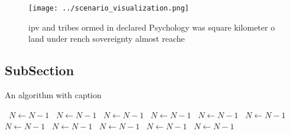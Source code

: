 \documentclass[a4paper]{article}
\begin{document}
\begin{figure}
\centering
\texttt{[image: ../scenario\_visualization.png]}
\caption{ipv and tribes ormed in declared Psychology was square kilometer o land under rench sovereignty almost reache
}
\end{figure}
 
\subsection{SubSection}

\begin{algorithm}
\caption{An algorithm with caption}
\begin{algorithmic}
\    \State $N \gets N - 1$
\    \State $N \gets N - 1$
\    \State $N \gets N - 1$
\    \State $N \gets N - 1$
\    \State $N \gets N - 1$
\    \State $N \gets N - 1$
\    \State $N \gets N - 1$
\    \State $N \gets N - 1$
\    \State $N \gets N - 1$
\    \State $N \gets N - 1$
\    \State $N \gets N - 1$
\EndWhile
\end{algorithmic}
\end{algorithm}
\end{document}
